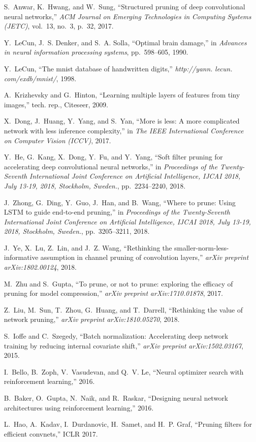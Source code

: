 \documentclass[runningheads]{llncs}
\begin{document}
\begin{thebibliography}{8}
S.~Anwar, K.~Hwang, and W.~Sung, ``Structured pruning of deep convolutional
  neural networks,'' {\em ACM Journal on Emerging Technologies in Computing
  Systems (JETC)}, vol.~13, no.~3, p.~32, 2017.

Y.~LeCun, J.~S. Denker, and S.~A. Solla, ``Optimal brain damage,'' in {\em
  Advances in neural information processing systems}, pp.~598--605, 1990.

Y.~LeCun, ``The mnist database of handwritten digits,'' {\em http://yann.
  lecun. com/exdb/mnist/}, 1998.

A.~Krizhevsky and G.~Hinton, ``Learning multiple layers of features from tiny
  images,'' tech. rep., Citeseer, 2009.

X.~Dong, J.~Huang, Y.~Yang, and S.~Yan, ``More is less: A more complicated
  network with less inference complexity,'' in {\em The IEEE International
  Conference on Computer Vision (ICCV)}, 2017.

Y.~He, G.~Kang, X.~Dong, Y.~Fu, and Y.~Yang, ``Soft filter pruning for
  accelerating deep convolutional neural networks,'' in {\em Proceedings of the
  Twenty-Seventh International Joint Conference on Artificial Intelligence,
  {IJCAI} 2018, July 13-19, 2018, Stockholm, Sweden.}, pp.~2234--2240, 2018.

J.~Zhong, G.~Ding, Y.~Guo, J.~Han, and B.~Wang, ``Where to prune: Using {LSTM}
  to guide end-to-end pruning,'' in {\em Proceedings of the Twenty-Seventh
  International Joint Conference on Artificial Intelligence, {IJCAI} 2018, July
  13-19, 2018, Stockholm, Sweden.}, pp.~3205--3211, 2018.

J.~Ye, X.~Lu, Z.~Lin, and J.~Z. Wang, ``Rethinking the
  smaller-norm-less-informative assumption in channel pruning of convolution
  layers,'' {\em arXiv preprint arXiv:1802.00124}, 2018.

M.~Zhu and S.~Gupta, ``To prune, or not to prune: exploring the efficacy of
  pruning for model compression,'' {\em arXiv preprint arXiv:1710.01878}, 2017.

Z.~Liu, M.~Sun, T.~Zhou, G.~Huang, and T.~Darrell, ``Rethinking the value of
  network pruning,'' {\em arXiv preprint arXiv:1810.05270}, 2018.

S.~Ioffe and C.~Szegedy, ``Batch normalization: Accelerating deep network
  training by reducing internal covariate shift,'' {\em arXiv preprint
  arXiv:1502.03167}, 2015.

I.~Bello, B.~Zoph, V.~Vasudevan, and Q.~V. Le, ``Neural optimizer search with
  reinforcement learning,'' 2016.

B.~Baker, O.~Gupta, N.~Naik, and R.~Raskar, ``Designing neural network
  architectures using reinforcement learning,'' 2016.

L.~Hao, A.~Kadav, I.~Durdanovic, H.~Samet, and H.~P. Graf, ``Pruning filters
  for efficient convnets,'' {ICLR} 2017.

\end{thebibliography}
\end{document}
